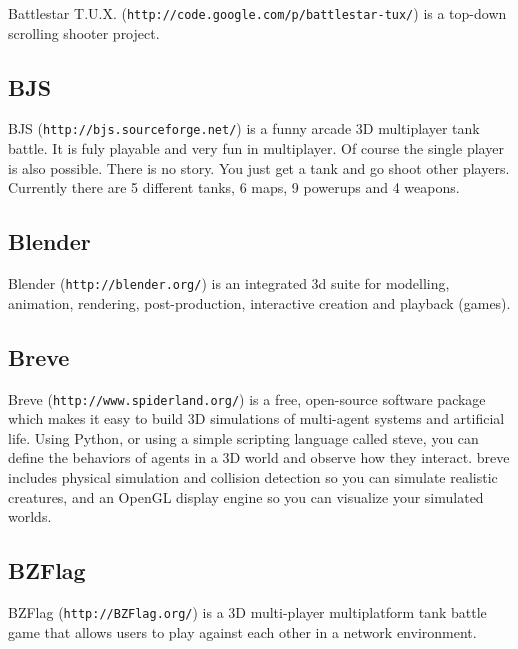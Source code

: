Battlestar T.U.X. ({\tt http://code.google.com/p/battlestar-tux/}) is a top-down scrolling shooter project.\subsection{BJS}\label{ftgl-projects_bjs}
BJS ({\tt http://bjs.sourceforge.net/}) is a funny arcade 3D multiplayer tank battle. It is fuly playable and very fun in multiplayer. Of course the single player is also possible. There is no story. You just get a tank and go shoot other players. Currently there are 5 different tanks, 6 maps, 9 powerups and 4 weapons.\subsection{Blender}\label{ftgl-projects_blender}
Blender ({\tt http://blender.org/}) is an integrated 3d suite for modelling, animation, rendering, post-production, interactive creation and playback (games).\subsection{Breve}\label{ftgl-projects_breve}
Breve ({\tt http://www.spiderland.org/}) is a free, open-source software package which makes it easy to build 3D simulations of multi-agent systems and artificial life. Using Python, or using a simple scripting language called steve, you can define the behaviors of agents in a 3D world and observe how they interact. breve includes physical simulation and collision detection so you can simulate realistic creatures, and an OpenGL display engine so you can visualize your simulated worlds.\subsection{BZFlag}\label{ftgl-projects_bzflag}
BZFlag ({\tt http://BZFlag.org/}) is a 3D multi-player multiplatform tank battle game that allows users to play against each other in a network environment.


